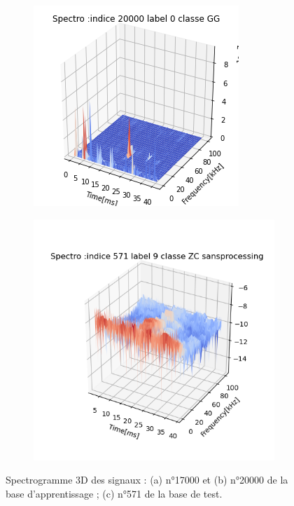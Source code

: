 \begin{figure}[!h]
\begin{subfigure}[b]{0.3\textwidth}
    \includegraphics[width=\textwidth]{./images/indice20000Spectro3Dlabel9classeZCsansprocessingsanszoom.png}
        \caption{}
  \end{subfigure}
  \begin{subfigure}[b]{0.3\textwidth}
    \includegraphics[width=\textwidth]{./images/indice571Spectro3Dlabel9classeZCsansprocessingsanszoom.png}
        \caption{}
  \end{subfigure}
  \caption{Spectrogramme 3D des signaux : (a) n°17000 et (b) n°20000 de la base d'apprentissage ; (c) n°571 de la base de test.%
	\label{fig:spectros3D}}
\end{figure}


